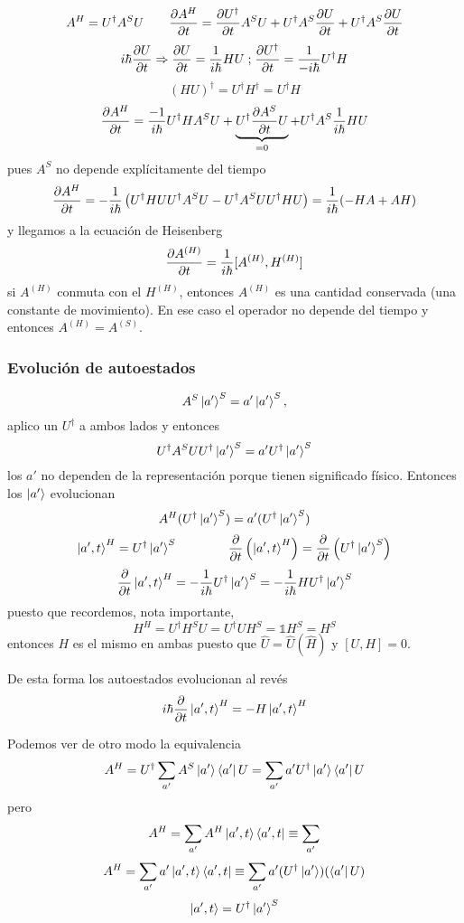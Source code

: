 \documentclass[10pt,oneside]{CBFT_book}
\begin{document}
\[
	A^H = U^\dagger A^S U \qquad \frac{\partial^{\hspace{-0.05em}} {A^H}}{\partial {t}^{\hspace{-0.05em}}} = \frac{\partial^{\hspace{-0.05em}} {U^\dagger}}{\partial {t}^{\hspace{-0.05em}}}A^S U + U^\dagger A^S \frac{\partial^{\hspace{-0.05em}} {U}}{\partial {t}^{\hspace{-0.05em}}} +
	U^\dagger A^S \frac{\partial^{\hspace{-0.05em}} {U}}{\partial {t}^{\hspace{-0.05em}}}
\]
\[
	i\hbar \frac{\partial^{\hspace{-0.05em}} {U}}{\partial {t}^{\hspace{-0.05em}}} \Rightarrow  \frac{\partial^{\hspace{-0.05em}} {U}}{\partial {t}^{\hspace{-0.05em}}} = \frac{1}{i\hbar}HU \; \text{;} \;
	\frac{\partial^{\hspace{-0.05em}} {U^\dagger}}{\partial {t}^{\hspace{-0.05em}}} = \frac{1}{-i\hbar}U^\dagger H
\]
\[
	(HU)^\dagger = U^\dagger H^\dagger = U^\dagger H 
\]
\[
	\frac{\partial^{\hspace{-0.05em}} {A^H}}{\partial {t}^{\hspace{-0.05em}}} = \frac{-1}{i\hbar} U^\dagger H A^S U + \underbrace{U^\dagger\frac{\partial^{\hspace{-0.05em}} {A^S}}{\partial {t}^{\hspace{-0.05em}}} U}_{=0} +
	U^\dagger A^S \frac{1}{i\hbar} H U
\]
pues $A^S$ no depende explícitamente del tiempo
\[
	\frac{\partial^{\hspace{-0.05em}} {A^H}}{\partial {t}^{\hspace{-0.05em}}} = -\frac{1}{i\hbar} \left( U^\dagger HUU^\dagger A^SU -U^\dagger A^S U U^\dagger 
	HU \right) =	\frac{1}{i\hbar}(-HA + AH)
\]
y llegamos a la ecuación de Heisenberg
\[
	\frac{\partial^{\hspace{-0.05em}} {A^{(H)}}}{\partial {t}^{\hspace{-0.05em}}} = \frac{1}{i\hbar} [ A^{(H)}, H^{(H)}]
\]
si $A^{(H)}$ conmuta con el $H^{(H)}$, entonces $A^{(H)}$ es una cantidad conservada (una constante de movimiento).
En ese caso el operador no depende del tiempo y entonces $A^{(H)} = A^{(S)}$.

\subsubsection{Evolución de autoestados}

\[
	A^S \Ket{a'}^S = a' \Ket{a'}^S,
\]
aplico un $U^\dagger$ a ambos lados y entonces 
\[
	U^\dagger A^S UU^\dagger \Ket{a'}^S = a' U^\dagger \Ket{a'}^S
\]
los $a'$ no dependen de la representación porque tienen significado físico. Entonces los $\Ket{a'}$ evolucionan
\[
	A^H (U^\dagger\Ket{a'}^S) = a' (U^\dagger\Ket{a'}^S)
\]
\[
	\Ket{a',t}^H = U^\dagger \Ket{a'}^S \qquad \qquad \frac{\partial^{\hspace{-0.05em}} {}}{\partial {t}^{\hspace{-0.05em}}}\left( \Ket{a',t}^H \right) = 
	\frac{\partial^{\hspace{-0.05em}} {}}{\partial {t}^{\hspace{-0.05em}}} \left( U^\dagger \Ket{a'}^S \right)
\]
\[
	\frac{\partial^{\hspace{-0.05em}} {}}{\partial {t}^{\hspace{-0.05em}}}\Ket{a',t}^H = -\frac{1}{i\hbar} U^\dagger \Ket{a'}^S =  -\frac{1}{i\hbar} H U^\dagger 
	\Ket{a'}^S
\]
puesto que recordemos, nota importante,
\[
	H^H = U^\dagger H^S U = U^\dagger U H^S = \mathbb{1}H^S = H^S
\]
entonces $H$ es el mismo en ambas puesto que $\hat{U} =\hat{U}(\hat{H})$ y $[U,H]=0$.

De esta forma los autoestados evolucionan al revés 
\[
	i\hbar \frac{\partial^{\hspace{-0.05em}} {}}{\partial {t}^{\hspace{-0.05em}}} \Ket{a',t}^H = -H\Ket{a',t}^H
\]

Podemos ver de otro modo la equivalencia
\[
	A^H = U^\dagger \sum_{a'} A^S \Ket{a'}\Bra{a'}U = 
	\sum_{a'} a'U^\dagger \Ket{a'}\Bra{a'}U
\]
pero 
\[
	A^H = \sum_{a'} A^H \Ket{a',t}\Bra{a',t} \equiv \sum_{a'}
\]
\[
	A^H = \sum_{a'} a' \Ket{a',t}\Bra{a',t} \equiv \sum_{a'} a'(U^\dagger\Ket{a'})(\Bra{a'}U)
\]
\[
	\Ket{a',t} = U^\dagger\Ket{a'}^S
\]
\end{document}
